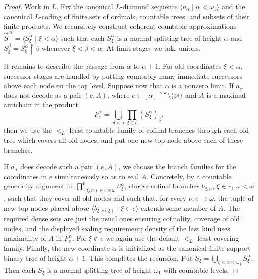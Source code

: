 \documentclass[a4paper,11pt]{article}
\begin{document}
\begin{proof}
Work in $L$.  Fix the canonical $L$-diamond sequence
$\langle a_\alpha\mid\alpha<\omega_1\rangle$ and the canonical $L$-coding of
finite sets of ordinals, countable trees, and subsets of their finite products.
We recursively construct coherent countable approximations
$\vec S^{\,\alpha}=\langle S^\alpha_\xi\mid \xi<\alpha\rangle$ such that each
$S^\alpha_\xi$ is a normal splitting tree of height $\alpha$ and
$S^\beta_\xi=S^\alpha_\xi\restriction\beta$ whenever $\xi<\beta<\alpha$.  At
limit stages we take unions.

It remains to describe the passage from $\alpha$ to $\alpha+1$.  For old
coordinates $\xi<\alpha$, successor stages are handled by putting countably
many immediate successors above each node on the top level.  Suppose now that
$\alpha$ is a nonzero limit.  If $a_\alpha$ does not decode as a pair
$(e,A)$, where $e\in[\alpha]^{<\omega}\setminus\{\varnothing\}$ and $A$ is a
maximal antichain in the product
\[
   P_e^\alpha=\bigcup_{\delta<\alpha}
      \prod_{\xi\in e}(S^\alpha_\xi)_\delta,
\]
then we use the $<_L$-least countable family of cofinal branches through each
old tree which covers all old nodes, and put one new top node above each of
these branches.

If $a_\alpha$ does decode such a pair $(e,A)$, we choose the branch families
for the coordinates in $e$ simultaneously so as to seal $A$.  Concretely, by a
countable genericity argument in
$\prod_{(\xi,n)\in e\times\omega}^{\mathrm{fs}}S^\alpha_\xi$, choose cofinal
branches $b_{\xi,n}$, $\xi\in e$, $n<\omega$, such that they cover all old
nodes and such that, for every $\nu:e\to\omega$, the tuple of new top nodes
placed above $\langle b_{\xi,\nu(\xi)}\mid\xi\in e\rangle$ extends some member
of $A$.  The required dense sets are just the usual ones ensuring cofinality,
coverage of old nodes, and the displayed sealing requirement; density of the
last kind uses maximality of $A$ in $P_e^\alpha$.  For $\xi\notin e$ we again
use the default $<_L$-least covering family.  Finally, the new coordinate
$\alpha$ is initialized as the canonical finite-support binary tree of height
$\alpha+1$.  This completes the recursion.  Put
$S_\xi=\bigcup_{\xi<\alpha<\omega_1}S^\alpha_\xi$.  Then each $S_\xi$ is a
normal splitting tree of height $\omega_1$ with countable levels.


\end{proof}
\end{document}
